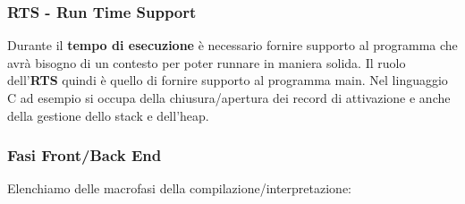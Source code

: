 \documentclass{article}
\begin{document}
\subsubsection{RTS - Run Time Support}

Durante il \textbf{tempo di esecuzione} è necessario fornire supporto al programma che avrà bisogno di un contesto per poter runnare in maniera solida. Il ruolo dell'\textbf{RTS} quindi è quello di fornire supporto al programma main. Nel linguaggio C ad esempio si occupa della chiusura/apertura dei record di attivazione e anche della gestione dello stack e dell'heap.

\subsubsection{Fasi Front/Back End}

Elenchiamo delle macrofasi della compilazione/interpretazione:
\end{document}
